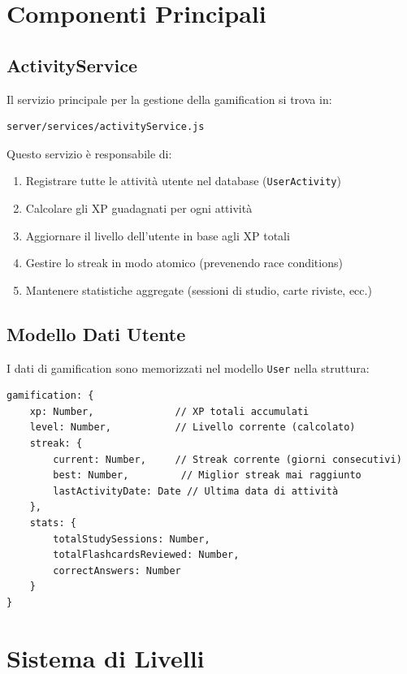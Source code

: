 \documentclass[11pt,a4paper]{article}
\begin{document}
\section{Componenti Principali}

\subsection{ActivityService}

Il servizio principale per la gestione della gamification si trova in:
\begin{lstlisting}
server/services/activityService.js
\end{lstlisting}

Questo servizio è responsabile di:
\begin{enumerate}
    \item Registrare tutte le attività utente nel database (\texttt{UserActivity})
    \item Calcolare gli XP guadagnati per ogni attività
    \item Aggiornare il livello dell'utente in base agli XP totali
    \item Gestire lo streak in modo atomico (prevenendo race conditions)
    \item Mantenere statistiche aggregate (sessioni di studio, carte riviste, ecc.)
\end{enumerate}

\subsection{Modello Dati Utente}

I dati di gamification sono memorizzati nel modello \texttt{User} nella struttura:

\begin{lstlisting}
gamification: {
    xp: Number,              // XP totali accumulati
    level: Number,           // Livello corrente (calcolato)
    streak: {
        current: Number,     // Streak corrente (giorni consecutivi)
        best: Number,         // Miglior streak mai raggiunto
        lastActivityDate: Date // Ultima data di attività
    },
    stats: {
        totalStudySessions: Number,
        totalFlashcardsReviewed: Number,
        correctAnswers: Number
    }
}
\end{lstlisting}

\section{Sistema di Livelli}
\end{document}
